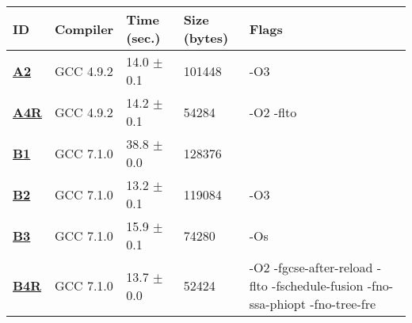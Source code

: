     \begin{tabular}{|l|l|l|l|p{3.2in}|}
     \hline
      \textbf{ID} & \textbf{Compiler} & \textbf{Time (sec.)} & \textbf{Size (bytes)} & \textbf{Flags} \\ 
     \hline
      \textbf{ \href{http://cknowledge.org/repo/web.php?wcid=experiment:21f631290c7846ee\&subpoint=b3d50b1184e6ebed}{A2} } &  GCC 4.9.2  &  14.0 $\pm$ 0.1  &  101448  & {\small -O3 }\\
     \hline
      \textbf{ \href{http://cknowledge.org/repo/web.php?wcid=experiment:85a9d07941d187e4\&subpoint=c59cc63440c795a7}{A4R} } &  GCC 4.9.2  &  14.2 $\pm$ 0.1  &  54284  & {\small -O2 -flto }\\
     \hline
      \textbf{ \href{http://cknowledge.org/repo/web.php?wcid=experiment:755bdc4154a3240e\&subpoint=479684c44854800c}{B1} } &  GCC 7.1.0  &  38.8 $\pm$ 0.0  &  128376  & {\small  }\\
     \hline
      \textbf{ \href{http://cknowledge.org/repo/web.php?wcid=experiment:50948cede943469a\&subpoint=381aef856bc24d3d}{B2} } &  GCC 7.1.0  &  13.2 $\pm$ 0.1  &  119084  & {\small -O3 }\\
     \hline
      \textbf{ \href{http://cknowledge.org/repo/web.php?wcid=experiment:4cc78e1a736bc05e\&subpoint=7177c749f6b5004a}{B3} } &  GCC 7.1.0  &  15.9 $\pm$ 0.1  &  74280  & {\small -Os }\\
     \hline
      \textbf{ \href{http://cknowledge.org/repo/web.php?wcid=experiment:3a9a0b4e4740a607\&subpoint=a8e09e075b5b4a38}{B4R} } &  GCC 7.1.0  &  13.7 $\pm$ 0.0  &  52424  & {\small -O2 -fgcse-after-reload -flto -fschedule-fusion -fno-ssa-phiopt -fno-tree-fre }\\
     \hline
    \end{tabular}    